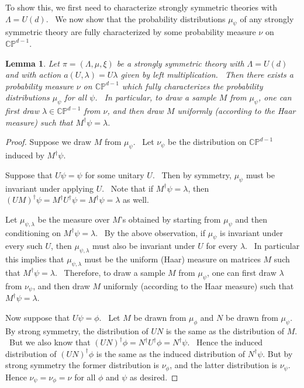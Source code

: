 \documentclass[letterpaper,11pt]{article}
\newtheorem{lem}{Lemma}
\begin{document}
To show this, we first need to characterize strongly symmetric theories with $\Lambda=U(d)$. \ We now show that the probability distributions $\mu_\psi$ of any strongly symmetric theory are fully characterized by some probability measure $\nu$ on $\mathbb{CP}^{d-1}$.


\begin{lem} Let $\pi=(\Lambda,\mu,\xi)$ be a strongly symmetric theory with $\Lambda=U(d)$ and with action $a(U, \lambda)=U\lambda$ given by left multiplication. \ Then there exists a probability measure $\nu$ on $\mathbb{CP}^{d-1}$ which fully characterizes the probability distributions $\mu_\psi$ for all $\psi$. \ In particular, to draw a sample $M$ from $\mu_\psi$, one can first draw $\lambda \in \mathbb{CP}^{d-1}$ from $\nu$, and then draw $M$ uniformly (according to the Haar measure) such that $M^\dagger \psi = \lambda$.
\label{lem:existence-nu}
\end{lem}


\begin{proof}
Suppose we draw $M$ from $\mu_\psi$. \ Let $\nu_\psi$ be the distribution on $\mathbb{CP}^{d-1}$ induced by $M^\dagger \psi$.

Suppose that $U\psi=\psi$ for some unitary $U$. \ Then by symmetry, $\mu_\psi$ must be invariant under applying $U$. \ Note that if $M^\dagger \psi= \lambda$, then $(UM)^\dagger \psi = M^\dagger U^\dagger \psi = M^\dagger \psi = \lambda$ as well.


Let $\mu_{\psi, \lambda}$ be the measure over $M$'s obtained by starting from $\mu_\psi$ and then conditioning on $M^\dagger \psi= \lambda$. \ By the above observation, if $\mu_\psi$ is invariant under every such $U$, then $\mu_{\psi, \lambda}$ must also be invariant under $U$ for every $\lambda$. \ In particular this implies that $\mu_{\psi, \lambda}$ must be the uniform (Haar) measure on matrices $M$ such that $M^\dagger \psi = \lambda$. \ Therefore, to draw a sample $M$ from $\mu_\psi$, one can first draw $\lambda$ from $\nu_\psi$, and then draw $M$ uniformly (according to the Haar measure) such that $M^\dagger \psi = \lambda$.

Now suppose that $U\psi=\phi$. \ Let $M$ be drawn from $\mu_\phi$ and $N$ be drawn from $\mu_\psi$. By strong symmetry, the distribution of $UN$ is the same as the distribution of $M$. \ But we also know that $(UN)^\dagger \phi = N^\dagger U^\dagger \phi = N^\dagger \psi$. \ Hence the induced distribution of $(UN)^\dagger \phi$ is the same as the induced distribution of $N^\dagger \psi$. But by strong symmetry the former distribution is $\nu_\phi$, and the latter distribution is $\nu_\psi$. Hence $\nu_\psi=\nu_\phi = \nu$ for all $\phi$ and $\psi$ as desired.


\end{proof}
\end{document}
